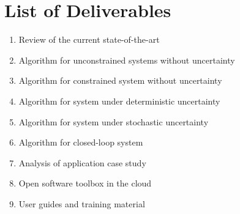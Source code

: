 \documentclass[oneside,11pt,a4paper]{article}
\newcommand*{\boldname}[3]{%
    \def\lastname{#1}%
    \def\firstname{#2}%
    \def\firstinit{#3}}
\begin{document}
\section{List of Deliverables}
\begin{enumerate}[nosep]
    \item Review of the current state-of-the-art
    \item Algorithm for unconstrained systems without uncertainty
    \item Algorithm for constrained system without uncertainty
    \item Algorithm for system under deterministic uncertainty
    \item Algorithm for system under stochastic uncertainty
    \item Algorithm for closed-loop system
    \item Analysis of application case study
    \item Open software toolbox in the cloud
    \item User guides and training material
\end{enumerate}

\renewcommand{\refname}{References}
\setlength{\baselineskip}{0mm}
\boldname{Manthanwar}{Amit M.}{A. M.}
\printbibliography

%
%
\end{document}
